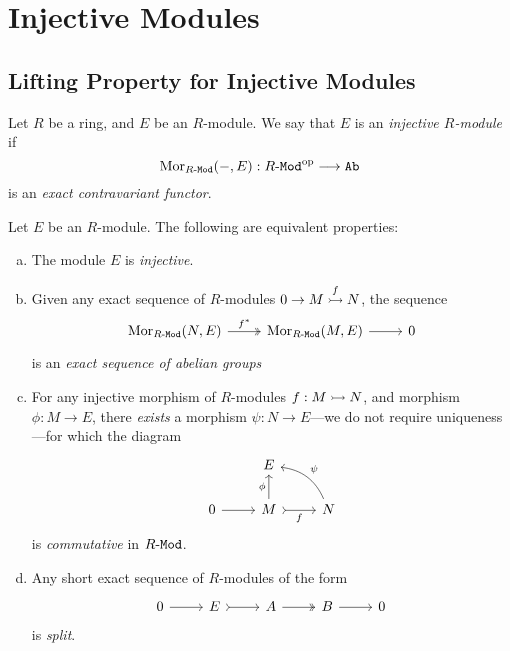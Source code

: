 \section{Injective Modules}

\subsection{Lifting Property for Injective Modules}

\begin{definition}
\label{def:injective-modules}
Let \(R\) be a ring, and \(E\) be an \(R\)-module. We say that \(E\) is an
\emph{injective \(R\)-module} if
\[
\operatorname{Mor}_{{R\text{-}\texttt{Mod}}}(-, E): {R\text{-}\texttt{Mod}}^{\mathrm{op}} \longrightarrow {\texttt{Ab}}
\]
is an \emph{exact contravariant functor}.
\end{definition}

\begin{proposition}
\label{prop:injective-modules-equivalences}
Let \(E\) be an \(R\)-module. The following are equivalent properties:
\begin{enumerate}[(a)]\setlength\itemsep{0em}
\item The module \(E\) is \emph{injective}.

\item Given any exact sequence of \(R\)-modules \(0 \to M \overset{f}{\rightarrowtail} N\),
  the sequence
  \[
  \begin{tikzcd}
  \Hom_{\Mod{R}}(N, E) \ar[r, two heads, "f^{*}"] &\Hom_{\Mod{R}}(M, E) \ar[r] &0
  \end{tikzcd}
  \]
  is an \emph{exact sequence of abelian groups}

\item For any injective morphism of \(R\)-modules \(f: M \rightarrowtail N\), and morphism
  \(\phi: M \to E\), there \emph{exists} a morphism \(\psi: N \to E\)---we do
  not require uniqueness---for which the diagram
  \[
  \begin{tikzcd}
  &E & \\
  0 \ar[r] &M \ar[r, tail, "f"'] \ar[u, "\phi"] &N \ar[lu, bend right, "\psi"']
  \end{tikzcd}
  \]
  is \emph{commutative} in \({R\text{-}\texttt{Mod}}\).

\item Any
  short exact sequence of \(R\)-modules of the form
  \[
  \begin{tikzcd}
  0 \ar[r] &E \ar[r, tail] &A \ar[r, two heads] &B \ar[r] &0
  \end{tikzcd}
  \]
  is \emph{split}.
\end{enumerate}
\end{proposition}

